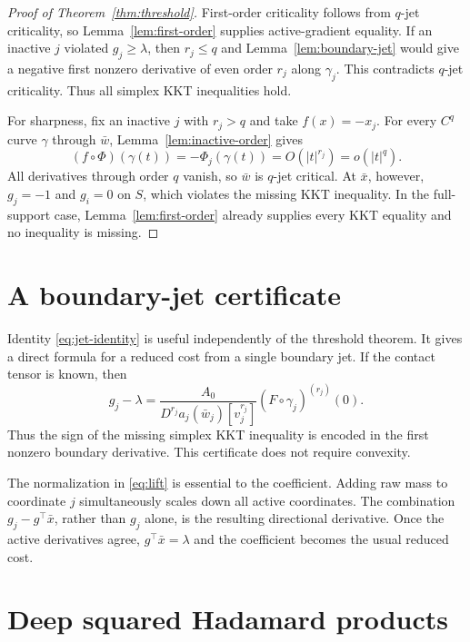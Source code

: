 \documentclass[11pt]{article}
\theoremstyle{definition}
\theoremstyle{remark}
\begin{document}
\begin{proof}[Proof of Theorem~\ref{thm:threshold}]
First-order criticality follows from $q$-jet criticality, so
Lemma~\ref{lem:first-order} supplies active-gradient equality. If an inactive
$j$ violated $g_j\ge\lambda$, then $r_j\le q$ and
Lemma~\ref{lem:boundary-jet} would give a negative first nonzero derivative of
even order $r_j$ along $\gamma_j$. This contradicts $q$-jet criticality.
Thus all simplex KKT inequalities hold.

For sharpness, fix an inactive $j$ with $r_j>q$ and take $f(x)=-x_j$. For
every $C^q$ curve $\gamma$ through $\bar w$,
Lemma~\ref{lem:inactive-order} gives
\[
  (f\circ\Phi)(\gamma(t))=-\Phi_j(\gamma(t))=O(|t|^{r_j})=o(|t|^q).
\]
All derivatives through order $q$ vanish, so $\bar w$ is $q$-jet critical.
At $\bar x$, however, $g_j=-1$ and $g_i=0$ on $S$, which violates the
missing KKT inequality. In the full-support case, Lemma~\ref{lem:first-order}
already supplies every KKT equality and no inequality is missing.
\end{proof}

\section{A boundary-jet certificate}\label{sec:certificate}

Identity \eqref{eq:jet-identity} is useful independently of the threshold
theorem. It gives a direct formula for a reduced cost from a single boundary
jet. If the contact tensor is known, then
\begin{equation}\label{eq:reduced-cost}
  g_j-\lambda
  =\frac{A_0}{D^{r_j}a_j(\bar w_j)[v_j^{r_j}]}
   (F\circ\gamma_j)^{(r_j)}(0).
\end{equation}
Thus the sign of the missing simplex KKT inequality is encoded in the first
nonzero boundary derivative. This certificate does not require convexity.

The normalization in \eqref{eq:lift} is essential to the coefficient. Adding
raw mass to coordinate $j$ simultaneously scales down all active coordinates.
The combination $g_j-g^\top\bar x$, rather than $g_j$ alone, is the resulting
directional derivative. Once the active derivatives agree,
$g^\top\bar x=\lambda$ and the coefficient becomes the usual reduced cost.

\section{Deep squared Hadamard products}\label{sec:hadamard}
\end{document}
